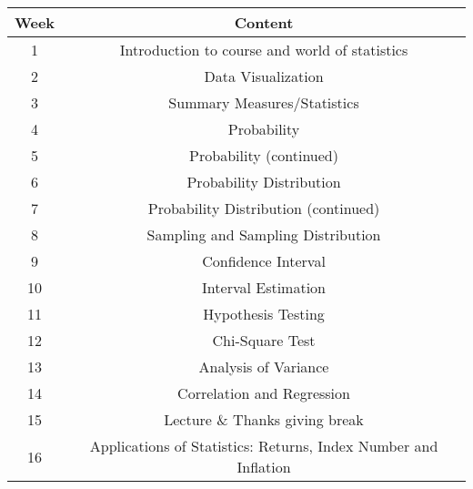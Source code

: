 \documentclass[12pt,letterpaper]{article}
\begin{document}
\begin{center}
	\begin{tabular}{|c|c|}
		\hline
		Week&Content\\ \hline
		1&Introduction to course and world of statistics\\ \hline
		2&Data Visualization\\ \hline
		3&Summary Measures/Statistics\\ \hline
		4&Probability\\ \hline
		5&Probability (continued)\\ \hline
		6&Probability Distribution \\ \hline
		7&Probability Distribution (continued)\\ \hline
		8&Sampling and Sampling Distribution\\ \hline
		9&Confidence Interval\\ \hline
		10&Interval Estimation\\ \hline
		11&Hypothesis Testing\\ \hline
		12&Chi-Square Test\\ \hline
		13&Analysis of Variance\\ \hline
		14& Correlation and Regression\\ \hline
		15&Lecture \& Thanks giving break \\ \hline
		16&Applications of Statistics: Returns, Index Number and Inflation\\ \hline
	\end{tabular}
\end{center}
\end{document}
